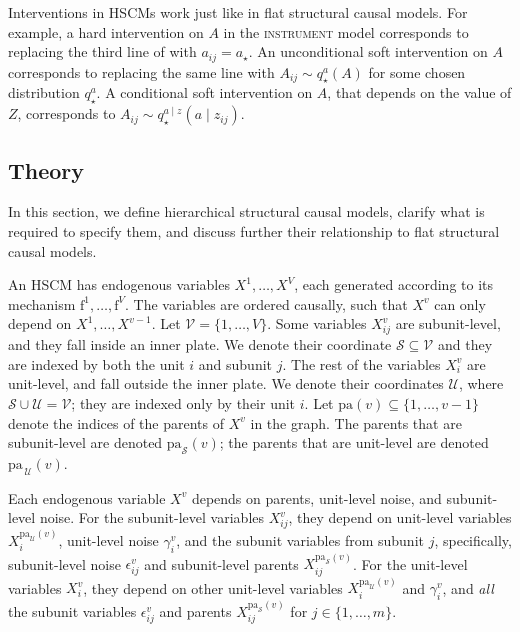 \documentclass[12pt]{article}
\newcommand{\pa}{\mathrm{pa}}
\newcommand{\f}{\mathrm{f}}
\begin{document}
Interventions in HSCMs work just like in flat structural causal models. For example, a hard intervention on $A$ in the \textsc{instrument} model corresponds to replacing the third line of  with $a_{ij} = a_\star$.  An unconditional soft intervention on $A$ corresponds to replacing the same line with $A_{ij} \sim q_\star^a(A)$ for some chosen distribution $q_\star^a$. A conditional soft intervention on $A$, that depends on the value of $Z$, corresponds to $A_{ij} \sim q_\star^{a \mid z}(a \mid z_{ij})$.

\subsection{Theory}
\label{sec:general-hscm}

In this section, we define hierarchical structural causal models, clarify what is required to specify them, and discuss further their relationship to flat structural causal models.

An HSCM has endogenous variables $X^1, \ldots, X^V$, each generated according to its mechanism $\f^1,\ldots,\f^V$. The variables are ordered causally, such that $X^v$ can only depend on $X^1, \ldots, X^{v-1}$.  Let $\mathcal{V} = \{1, \ldots, V\}$. Some variables $X_{ij}^v$ are subunit-level, and they fall inside an inner plate. We denote their coordinate $\mathcal{S} \subseteq \mathcal{V}$ and they are indexed by both the unit $i$ and subunit $j$.  The rest of the variables $X_i^v$ are unit-level, and fall outside the inner plate. We denote their coordinates $\mathcal{U}$, where $\mathcal{S} \cup \mathcal{U} = \mathcal{V}$; they are indexed only by their unit $i$. Let $\pa(v) \subseteq \{1, \ldots, v-1\}$ denote the indices of the parents of $X^v$ in the graph.  The parents that are subunit-level are denoted $\pa_{\mathcal{S}}(v)$; the parents that are unit-level are denoted $\pa_{\,\mathcal{U}}(v)$.



Each endogenous variable $X^v$ depends on parents, unit-level noise, and subunit-level noise. For the subunit-level variables $X^v_{ij}$, they depend on unit-level variables $X_{i}^{\pa_\mathcal{U}(v)}$, unit-level noise $\gamma_i^v$, and the subunit variables from subunit $j$, specifically, subunit-level noise $\epsilon^v_{ij}$ and subunit-level parents $X^{\pa_\mathcal{S}(v)}_{ij}$. For the unit-level variables $X^v_{i}$, they depend on other unit-level variables $X_{i}^{\pa_\mathcal{U}(v)}$ and $\gamma_i^v$, and \textit{all} the subunit variables $\epsilon^v_{ij}$ and parents $X^{\pa_\mathcal{S}(v)}_{ij}$ for $j \in \{1, \ldots, m\}$.
\end{document}
